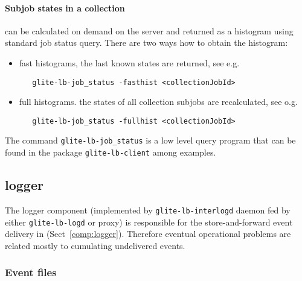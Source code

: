 \paragraph{Subjob states in a collection} can be calculated on demand on the server and
returned as a histogram using standard job status query. There are two ways how to obtain the 
histogram:
\begin{itemize}
\item fast histograms, the last known states are returned, see e.g.
\begin{verbatim}
   glite-lb-job_status -fasthist <collectionJobId>
\end{verbatim}
\item full histograms. the states of all collection subjobs are recalculated, see o.g.
\begin{verbatim}
   glite-lb-job_status -fullhist <collectionJobId>
\end{verbatim}
\end{itemize}
The command \verb'glite-lb-job_status' is a low level query program that can be
found in the package \verb'glite-lb-client' among examples.





\subsection{\LB logger}

\iffalse
\TODO{ljocha}

Karantena (od ktere verze to mame?)
- kdyz se nepodari rozparsovat soubor
- client/examples -- parse-logevent-file??, lze pouzit

Cistky pri zaseknuti, nesmyslna jobid apod.

Debugovaci rezim

Notifikacni IL
\fi

The logger component (implemented by \verb'glite-lb-interlogd' daemon fed by
either \verb'glite-lb-logd' or \LB proxy)
is responsible for the store-and-forward event delivery in \LB
(Sect~\ref{comp:logger}).
Therefore eventual operational problems are related mostly to 
cumulating undelivered events.

\subsubsection{Event files}


